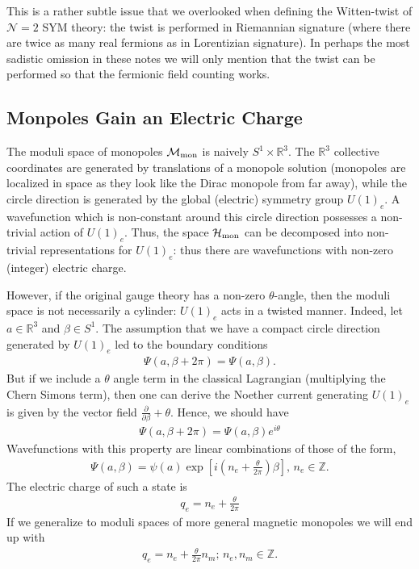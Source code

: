 \documentclass[12pt, onecolumn]{article}
\begin{document}
\vspace{5mm}

\noindent This is a rather subtle issue that we overlooked when defining the Witten-twist of $\mathcal{N}=2$ SYM theory: the twist is performed in Riemannian signature (where there are twice as many real fermions as in Lorentizian signature).  In perhaps the most sadistic omission in these notes we will only mention that the twist can be performed so that the fermionic field counting works.


\subsection{Monpoles Gain an Electric Charge}
\label{sec_mon_charge}
The moduli space of monopoles ${\cal M}_{\text{mon}}$ is naively $S^{1} \times \mathbb{R}^{3}$.  The $\mathbb{R}^{3}$ collective coordinates are generated by translations of a monopole solution (monopoles are localized in space as they look like the Dirac monopole from far away), while the circle direction is generated by the global (electric) symmetry group $U(1)_{e}$.  A wavefunction which is non-constant around this circle direction possesses a non-trivial action of $U(1)_{e}$.  Thus, the space ${\cal H}_{\text{mon}}$ can be decomposed into non-trivial representations for $U(1)_{e}$: thus there are wavefunctions with non-zero (integer) electric charge.

\vspace{5mm}

\noindent However, if the original gauge theory has a non-zero $\theta$-angle, then the moduli space is not necessarily a cylinder: $U(1)_{e}$ acts in a twisted manner.  Indeed, let $a \in \mathbb{R}^{3}$ and $\beta \in S^{1}$.  The assumption that we have a compact circle direction generated by $U(1)_{e}$ led to the boundary conditions
\begin{align*}
\Psi(a,\beta+2\pi)= \Psi(a,\beta).
\end{align*}
But if we include a $\theta$ angle term in the classical Lagrangian (multiplying the Chern Simons term), then one can derive the Noether current generating $U(1)_{e}$ is given by the vector field $\frac{\partial}{\partial \beta}+\theta$.  Hence, we should have
\begin{align*}
\Psi(a,\beta+2\pi)=\Psi(a,\beta)e^{i\theta}
\end{align*} 
Wavefunctions with this property are linear combinations of those of the form,
\begin{align*}
\Psi(a,\beta)=\psi(a)\exp\left[i\left(n_{e}+\frac{\theta}{2\pi}\right)\beta\right],\, n_{e} \in \mathbb{Z}.
\end{align*}
The electric charge of such a state is
\begin{align*}
q_{e}=n_{e}+\frac{\theta}{2\pi}
\end{align*}
If we generalize to moduli spaces of more general magnetic monopoles we will end up with
\begin{align*}
q_{e}=n_{e}+\frac{\theta}{2\pi}n_{m}; \,n_{e},n_{m} \in \mathbb{Z}.
\end{align*}
\end{document}
